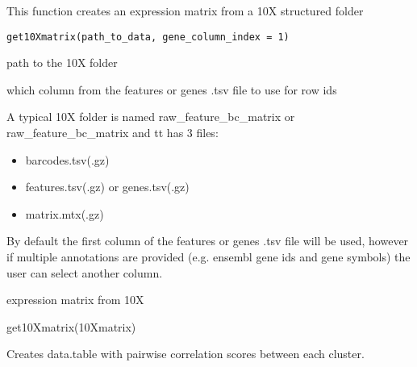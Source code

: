 \documentclass[a4paper]{book}
\begin{document}
%
\begin{Description}\relax
This function creates an expression matrix from a 10X structured folder
\end{Description}
%
\begin{Usage}
\begin{verbatim}
get10Xmatrix(path_to_data, gene_column_index = 1)
\end{verbatim}
\end{Usage}
%
\begin{Arguments}
\begin{ldescription}
\item[\code{path\_to\_data}] path to the 10X folder

\item[\code{gene\_column\_index}] which column from the features or genes .tsv file to use for row ids
\end{ldescription}
\end{Arguments}
%
\begin{Details}\relax
A typical 10X folder is named raw\_feature\_bc\_matrix or raw\_feature\_bc\_matrix and tt has 3 files:
\begin{itemize}

\item{} barcodes.tsv(.gz)
\item{} features.tsv(.gz) or genes.tsv(.gz)
\item{} matrix.mtx(.gz)

\end{itemize}

By default the first column of the features or genes .tsv file will be used, however if multiple
annotations are provided (e.g. ensembl gene ids and gene symbols) the user can select another column.
\end{Details}
%
\begin{Value}
expression matrix from 10X
\end{Value}
%
\begin{Examples}
\begin{ExampleCode}
    get10Xmatrix(10Xmatrix)
\end{ExampleCode}
\end{Examples}
%
\begin{Description}\relax
Creates data.table with pairwise correlation scores between each cluster.
\end{Description}
\end{document}

